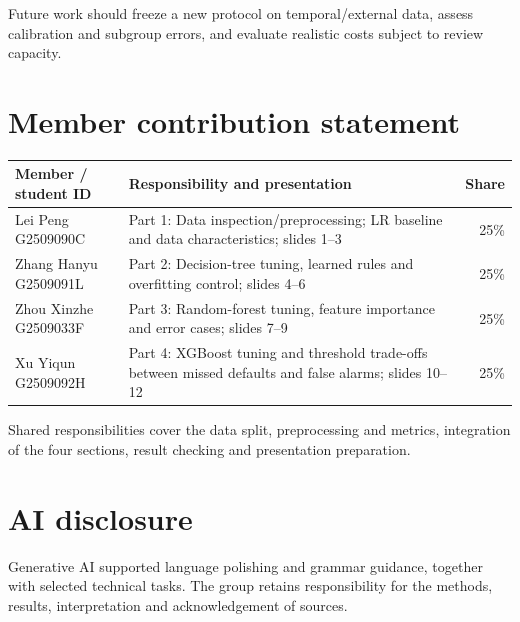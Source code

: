\documentclass{article}
\begin{document}
Future work should freeze a new protocol on temporal/external data, assess calibration and subgroup errors, and evaluate realistic costs subject to review capacity.

\section*{Member contribution statement}
\begin{center}
\begin{minipage}{\linewidth}
\centering
\begin{tabularx}{\linewidth}{@{}p{30mm}Xr@{}}\toprule
Member / student ID & Responsibility and presentation & Share\\\midrule
\shortstack[l]{Lei Peng\\
G2509090C} & Part 1: Data inspection/preprocessing; LR baseline and data characteristics; slides 1--3 & 25\%\\
\shortstack[l]{Zhang Hanyu\\
G2509091L} & Part 2: Decision-tree tuning, learned rules and overfitting control; slides 4--6 & 25\%\\
\shortstack[l]{Zhou Xinzhe\\
G2509033F} & Part 3: Random-forest tuning, feature importance and error cases; slides 7--9 & 25\%\\
\shortstack[l]{Xu Yiqun\\
G2509092H} & Part 4: XGBoost tuning and threshold trade-offs between missed defaults and false alarms; slides 10--12 & 25\%\\
\bottomrule\end{tabularx}
\end{minipage}
\end{center}
Shared responsibilities cover the data split, preprocessing and metrics, integration of the four sections, result checking and presentation preparation.

\section*{AI disclosure}
Generative AI supported language polishing and grammar guidance, together with selected technical tasks. The group retains responsibility for the methods, results, interpretation and acknowledgement of sources.
\end{document}
